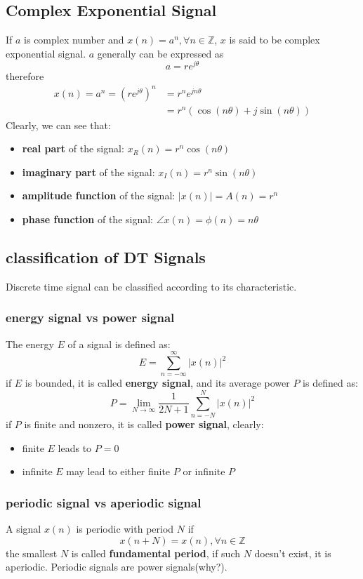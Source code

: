 \documentclass[10pt,a4paper,oneside]{article}
\begin{document}
\subsection{Complex Exponential Signal}
If $a$ is complex number and $x(n) = a^n, \forall n \in \mathbb{Z}$, $x$ is said to be complex exponential signal. $a$ generally can be expressed as
\[
a = re^{j\theta}
\]
therefore
\begin{align*}
x(n) = a^n = \left(re^{j\theta}\right)^n & = r^n e^{jn\theta}\\
& = r^n\left(\cos (n\theta) + j \sin (n\theta) \right)
\end{align*}
Clearly, we can see that:
\begin{itemize}
	\item \textbf{real part} of the signal: $x_R(n)= r^n \cos(n \theta)$
	\item \textbf{imaginary part} of the signal: $x_I(n)= r^n \sin(n \theta)$
	\item \textbf{amplitude function} of the signal: $\left|x(n)\right|= A(n) = r^n$
	\item \textbf{phase function} of the signal: $\angle x(n) = \phi(n) = n\theta$
\end{itemize}

\subsection{classification of DT Signals}
Discrete time signal can be classified according to its characteristic.

\subsubsection*{energy signal vs power signal}
The energy $E$ of a signal is defined as:
\[
E = \sum_{n=-\infty}^{\infty} |x(n)|^2
\]
if $E$ is bounded, it is called \textbf{energy signal}, and its average power $P$ is defined as:
\[
P = \lim_{N \rightarrow \infty} \frac{1}{2N+1} \sum_{n=-N}^{N} |x(n)|^2
\]
if $P$ is finite and nonzero, it is called \textbf{power signal}, clearly:
\begin{itemize}
	\item finite $E$ leads to $P=0$
	\item infinite $E$ may lead to either finite $P$ or infinite $P$
\end{itemize}

\subsubsection*{periodic signal vs aperiodic signal}
A signal $x(n)$ is periodic with period $N$ if
\[
x(n+N) = x(n), \forall n \in \mathbb{Z}
\]
the smallest $N$ is called \textbf{fundamental period}, if such $N$ doesn't exist, it is aperiodic. Periodic signals are power signals(why?).
\end{document}
